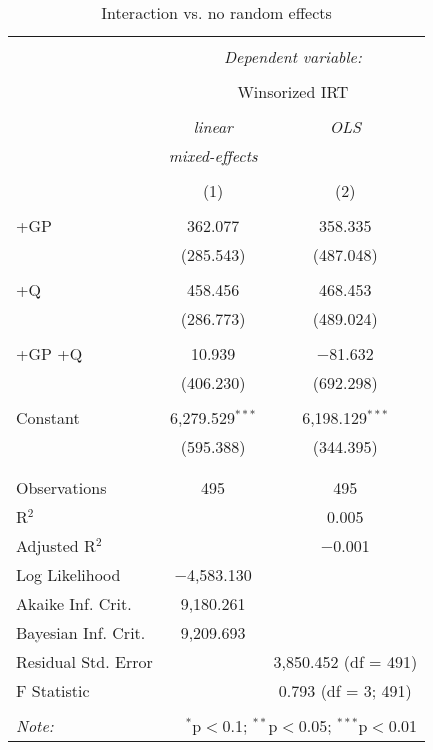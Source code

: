 \documentclass[]{tufte-handout}
\begin{document}
\begin{table}[!htbp] \centering 
  \caption{Interaction vs. no random effects} 
  \label{} 
\begin{tabular}{@{\extracolsep{5pt}}lcc} 
\\[-1.8ex]\hline 
\hline \\[-1.8ex] 
 & \multicolumn{2}{c}{\textit{Dependent variable:}} \\ 
\cline{2-3} 
\\[-1.8ex] & \multicolumn{2}{c}{Winsorized IRT} \\ 
\\[-1.8ex] & \textit{linear} & \textit{OLS} \\ 
 & \textit{mixed-effects} & \textit{} \\ 
\\[-1.8ex] & (1) & (2)\\ 
\hline \\[-1.8ex] 
 +GP & 362.077 & 358.335 \\ 
  & (285.543) & (487.048) \\ 
  & & \\ 
 +Q & 458.456 & 468.453 \\ 
  & (286.773) & (489.024) \\ 
  & & \\ 
 +GP +Q & 10.939 & $-$81.632 \\ 
  & (406.230) & (692.298) \\ 
  & & \\ 
 Constant & 6,279.529$^{***}$ & 6,198.129$^{***}$ \\ 
  & (595.388) & (344.395) \\ 
  & & \\ 
\hline \\[-1.8ex] 
Observations & 495 & 495 \\ 
R$^{2}$ &  & 0.005 \\ 
Adjusted R$^{2}$ &  & $-$0.001 \\ 
Log Likelihood & $-$4,583.130 &  \\ 
Akaike Inf. Crit. & 9,180.261 &  \\ 
Bayesian Inf. Crit. & 9,209.693 &  \\ 
Residual Std. Error &  & 3,850.452 (df = 491) \\ 
F Statistic &  & 0.793 (df = 3; 491) \\ 
\hline 
\hline \\[-1.8ex] 
\textit{Note:}  & \multicolumn{2}{r}{$^{*}$p$<$0.1; $^{**}$p$<$0.05; $^{***}$p$<$0.01} \\ 
\end{tabular} 
\end{table}
\end{document}
